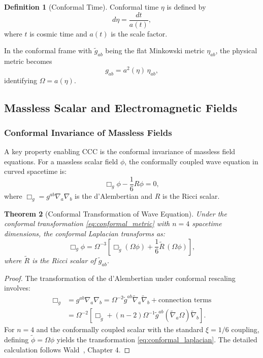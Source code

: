 \documentclass[11pt,a4paper]{article}
\newcommand{\conf}{\Omega}
\newcommand{\lapg}{\Box_g}
\newcommand{\laptg}{\Box_{\tilde{g}}}
\newcommand{\Ricci}{R}
\newcommand{\Riccit}{\tilde{R}}
\theoremstyle{plain}
\newtheorem{theorem}{Theorem}[section]
\theoremstyle{definition}
\newtheorem{definition}[theorem]{Definition}
\theoremstyle{remark}
\begin{document}
\begin{definition}[Conformal Time]
Conformal time $\eta$ is defined by
\begin{equation}
    d\eta = \frac{dt}{a(t)},
\end{equation}
where $t$ is cosmic time and $a(t)$ is the scale factor.
\end{definition}

In the conformal frame with $\tilde{g}_{ab}$ being the flat Minkowski metric $\eta_{ab}$, the physical metric becomes
\begin{equation}
    g_{ab} = a^2(\eta)\, \eta_{ab},
\end{equation}
identifying $\conf = a(\eta)$.

\subsection{Massless Scalar and Electromagnetic Fields}\label{subsec:massless_fields}

\subsubsection{Conformal Invariance of Massless Fields}

A key property enabling CCC is the conformal invariance of massless field equations. For a massless scalar field $\phi$, the conformally coupled wave equation in curved spacetime is:
\begin{equation}\label{eq:conformal_wave}
    \lapg \phi - \frac{1}{6}\Ricci \phi = 0,
\end{equation}
where $\lapg = g^{ab}\nabla_a\nabla_b$ is the d'Alembertian and $\Ricci$ is the Ricci scalar.

\begin{theorem}[Conformal Transformation of Wave Equation]\label{thm:conformal_laplacian}
Under the conformal transformation \eqref{eq:conformal_metric} with $n=4$ spacetime dimensions, the conformal Laplacian transforms as:
\begin{equation}\label{eq:conformal_laplacian}
    \lapg \phi = \conf^{-3}\left[\laptg(\conf\phi) + \frac{1}{6}\Riccit\,(\conf\phi)\right],
\end{equation}
where $\Riccit$ is the Ricci scalar of $\tilde{g}_{ab}$.
\end{theorem}

\begin{proof}
The transformation of the d'Alembertian under conformal rescaling involves:
\begin{align}
    \lapg &= g^{ab}\nabla_a\nabla_b = \conf^{-2}\tilde{g}^{ab}\tilde{\nabla}_a\tilde{\nabla}_b + \text{connection terms}\\
    &= \conf^{-2}\left[\laptg + (n-2)\conf^{-1}\tilde{g}^{ab}(\tilde{\nabla}_a\conf)\tilde{\nabla}_b\right].
\end{align}
For $n=4$ and the conformally coupled scalar with the standard $\xi = 1/6$ coupling, defining $\tilde{\phi} = \conf\phi$ yields the transformation \eqref{eq:conformal_laplacian}. The detailed calculation follows Wald~\cite{wald1984general}, Chapter 4.
\end{proof}
\end{document}
